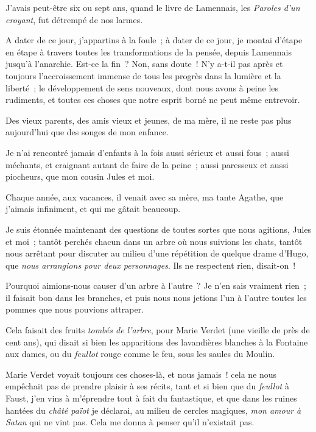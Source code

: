 \documentclass[french,twoside]{book} %
\begin{document}
J’avais peut-être six ou sept ans, quand le livre de Lamennais, les \emph{Paroles d’un croyant}, fut détrempé de nos larmes.\par
A dater de ce jour, j’appartins à la foule ; à dater de ce jour, je montai d’étape en étape à travers toutes les transformations de la pensée, depuis Lamennais jusqu’à l’anarchie. Est-ce la fin ? Non, sans doute ! N’y a-t-il pas après et toujours l’accroissement immense de tous les progrès dans la lumière et la liberté ; le développement de sens nouveaux, dont nous avons à peine les rudiments, et toutes ces choses que notre esprit borné ne peut même entrevoir.\par
Des vieux parents, des amis vieux et jeunes, de ma mère, il ne reste pas plus aujourd’hui que des songes de mon enfance.\par
 Je n’ai rencontré jamais d’enfants à la fois aussi sérieux et aussi fous ; aussi méchants, et craignant autant de faire de la peine ; aussi paresseux et aussi piocheurs, que mon cousin Jules et moi.\par
Chaque année, aux vacances, il venait avec sa mère, ma tante Agathe, que j’aimais infiniment, et qui me gâtait beaucoup.\par
Je suis étonnée maintenant des questions de toutes sortes que nous agitions, Jules et moi ; tantôt perchés chacun dans un arbre où nous suivions les chats, tantôt nous arrêtant pour discuter au milieu d’une répétition de quelque drame d’Hugo, que \emph{nous arrangions pour deux personnages}. Ils ne respectent rien, disait-on !\par
Pourquoi aimions-nous causer d’un arbre à l’autre ? Je n’en sais vraiment rien ; il faisait bon dans les branches, et puis nous nous jetions l’un à l’autre toutes les pommes que nous pouvions attraper.\par
Cela faisait des fruits \emph{tombés de l’arbre}, pour Marie Verdet (une vieille de près de cent ans), qui disait si bien les apparitions des lavandières blanches à la Fontaine aux dames, ou du \emph{feullot} rouge comme le feu, sous les saules du Moulin.\par
Marie Verdet voyait toujours ces choses-là, et nous jamais ! cela ne nous empêchait pas de prendre  plaisir à ses récits, tant et si bien que du \emph{feullot} à Faust, j’en vins à m’éprendre tout à fait du fantastique, et que dans les ruines hantées du \emph{châté païot} je déclarai, au milieu de cercles magiques, \emph{mon amour à Satan} qui ne vint pas. Cela me donna à penser qu’il n’existait pas.\par
\end{document}
